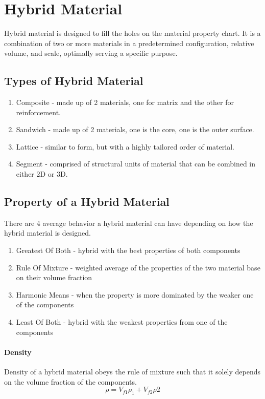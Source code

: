 \documentclass{article}
\begin{document}
    \section*{Hybrid Material}
    Hybrid material is designed to fill the holes on the material property chart.
    It is a combination of two or more materials in a predetermined 
    configuration, relative volume, and scale, optimally serving a specific 
    purpose.

    \subsection*{Types of Hybrid Material}
        \begin{enumerate}
            \item Composite - made up of 2 materials, one for matrix and the other for reinforcement.
            \item Sandwich - made up of 2 materials, one is the core, one is the outer surface.
            \item Lattice - similar to form, but with a highly tailored order of material. 
            \item Segment - comprised of structural units of material that can be combined in either 2D or 3D.
        \end{enumerate}
    
    \subsection*{Property of a Hybrid Material}
    There are 4 average behavior a hybrid material can have depending on how the hybrid material
    is designed.
        \begin{enumerate}
            \item Greatest Of Both - hybrid with the best properties of both components
            \item Rule Of Mixture - weighted average of the properties of the two material base on their volume fraction
            \item Harmonic Means - when the property is more dominated by the weaker one of the components
            \item Least Of Both - hybrid with the weakest properties from one of the components
        \end{enumerate}

    \paragraph*{Density\newline}
    Density of a hybrid material obeys the rule of mixture such that it solely depends on the volume fraction
    of the components.
    \begin{equation*}
        \rho = V_{f1}\rho_{1} + V_{f2}\rho{2}
    \end{equation*}
\end{document}
